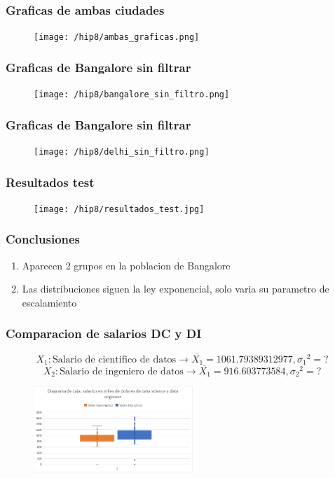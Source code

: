 \documentclass{beamer}
\begin{document}
\begin{frame}
  \frametitle{Graficas de ambas ciudades}
  \begin{figure}[t]
      \texttt{[image: /hip8/ambas\_graficas.png]}
  \end{figure}

\end{frame}

\begin{frame}
  \frametitle{Graficas de Bangalore sin filtrar}
  \begin{figure}[t]
      \texttt{[image: /hip8/bangalore\_sin\_filtro.png]}
  \end{figure}

\end{frame}

\begin{frame}
  \frametitle{Graficas de Bangalore sin filtrar}
  \begin{figure}[t]
      \texttt{[image: /hip8/delhi\_sin\_filtro.png]}
  \end{figure}
\end{frame}

\begin{frame}
  \frametitle{Resultados test}
  \begin{figure}[t]
      \texttt{[image: /hip8/resultados\_test.jpg]}
  \end{figure}
\end{frame}

\begin{frame}
  \frametitle{Conclusiones}
  \begin{enumerate}
   \item Aparecen 2 grupos en la poblacion de Bangalore
   \item Las distribuciones siguen la ley exponencial, solo
     varia su parametro de escalamiento
  \end{enumerate}
\end{frame}


\begin{frame}
  \frametitle{Comparacion de salarios DC y DI}
  \[{X_1}: \textrm{Salario de cientifico de datos} \rightarrow \overline{X_1} = 1061.79389312977, {\sigma_1}^2 = ?\]
  \[{X_2}: \textrm{Salario de ingeniero de datos} \rightarrow \overline{X_1} = 916.603773584, {\sigma_2}^2 = ?\]
\begin{figure}[t]
  \includegraphics[width=6cm]{cajas1.jpeg}
\end{figure}
\end{frame}
\end{document}
